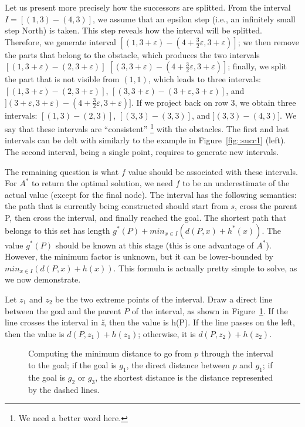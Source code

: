 Let us present more precisely how the successors are splitted.  
From the interval $I = [(1,3)-(4,3)]$, 
we assume that an epsilon step 
(i.e., an infinitely small step North) is taken.  
This step reveals how the interval will be splitted.  
Therefore, we generate interval 
$[(1,3+\varepsilon)-(4+\frac{3}{2}\varepsilon,3+\varepsilon)]$; 
we then remove the parts that belong to the obstacle, 
which produces the two intervals 
$[(1,3+\varepsilon)-(2,3+\varepsilon)]$ 
$[(3,3+\varepsilon)-(4+\frac{3}{2}\varepsilon,3+\varepsilon)]$; 
finally, we split the part that is not visible from $(1,1)$, 
which leads to three intervals: 
$[(1,3+\varepsilon)-(2,3+\varepsilon)]$, 
$[(3,3+\varepsilon)-(3+\varepsilon,3+\varepsilon)]$, 
and
$](3+\varepsilon,3+\varepsilon)-(4+\frac{3}{2}\varepsilon,3+\varepsilon)]$. 
If we project back on row 3, 
we obtain three intervals: 
$[(1,3)-(2,3)]$, 
$[(3,3)-(3,3)]$, 
and
$](3,3)-(4,3)]$. 
We say that these intervals are ``consistent''%
\footnote{We need a better word here.} 
with the obstacles.  
The first and last intervals can be delt with similarly 
to the example in Figure~\ref{fig::succ1} (left).  
The second interval, being a single point, 
requires to generate new intervals.  

The remaining question is what $f$ value 
should be associated with these intervals.  
For $A^*$ to return the optimal solution, 
we need $f$ to be an underestimate of the actual value 
(except for the final node).  
The interval has the following semantics: 
the path that is currently being constructed 
should start from $s$, cross the parent P, 
then cross the interval, and finally reached the goal.  
The shortest path that belongs to this set 
has length $g^*(P) + min_{x \in I}(d(P,x) + h^*(x))$.  
The value $g^*(P)$ should be known at this stage 
(this is one advantage of $A^*$).  
However, the minimum factor is unknown, 
but it can be lower-bounded by $min_{x \in I}(d(P,x) + h(x))$.  
This formula is actually pretty simple to solve, as we now demonstrate.  

Let $z_1$ and $z_2$ be the two extreme points of the interval.  
Draw a direct line between the goal and the parent $P$ of the interval, 
as shown in Figure~\ref{fig::fvalue}.  
If the line crosses the interval in \textit{\u z}, then the value is h(P).  If the line passes on the left, 
then the value is $d(P,z_1)+h(z_1)$; 
otherwise, it is $d(P,z_2)+h(z_2)$.  

\begin{figure}[ht]
  \begin{center}
    
  \end{center}
  \caption{Computing the minimum distance 
    to go from $p$ through the interval to the goal; 
    if the goal is $g_1$, the direct distance between $p$ and $g_1$; 
    if the goal is $g_2$ or $g_3$, 
    the shortest distance is the distance represented by the dashed lines.}
  \label{fig::fvalue}
\end{figure}
